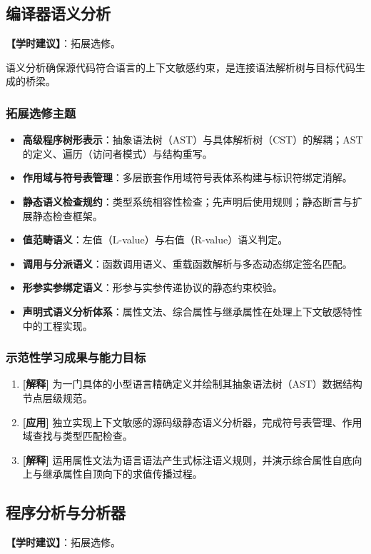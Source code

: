 \subsection{编译器语义分析}
\textbf{【学时建议】}：拓展选修。

语义分析确保源代码符合语言的上下文敏感约束，是连接语法解析树与目标代码生成的桥梁。

\subsubsection{拓展选修主题}
\begin{itemize}
    \item \textbf{高级程序树形表示}：抽象语法树（AST）与具体解析树（CST）的解耦；AST 的定义、遍历（访问者模式）与结构重写。
    \item \textbf{作用域与符号表管理}：多层嵌套作用域符号表体系构建与标识符绑定消解。
    \item \textbf{静态语义检查规约}：类型系统相容性检查；先声明后使用规则；静态断言与扩展静态检查框架。
    \item \textbf{值范畴语义}：左值（L-value）与右值（R-value）语义判定。
    \item \textbf{调用与分派语义}：函数调用语义、重载函数解析与多态动态绑定签名匹配。
    \item \textbf{形参实参绑定语义}：形参与实参传递协议的静态约束校验。
    \item \textbf{声明式语义分析体系}：属性文法、综合属性与继承属性在处理上下文敏感特性中的工程实现。
\end{itemize}

\subsubsection{示范性学习成果与能力目标}
\begin{enumerate}
    \item \textbf{[解释]} 为一门具体的小型语言精确定义并绘制其抽象语法树（AST）数据结构节点层级规范。
    \item \textbf{[应用]} 独立实现上下文敏感的源码级静态语义分析器，完成符号表管理、作用域查找与类型匹配检查。
    \item \textbf{[解释]} 运用属性文法为语言语法产生式标注语义规则，并演示综合属性自底向上与继承属性自顶向下的求值传播过程。
\end{enumerate}

\subsection{程序分析与分析器}
\textbf{【学时建议】}：拓展选修。

